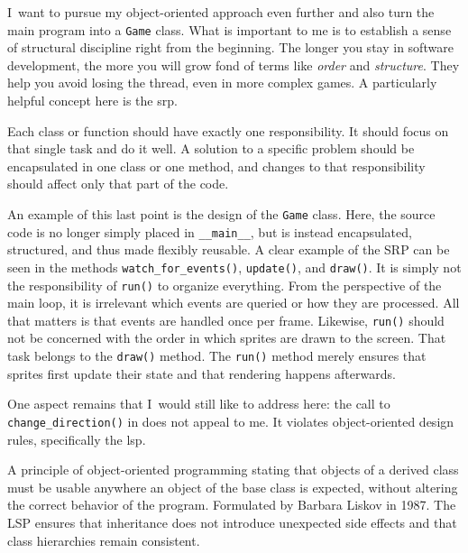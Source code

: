 I~want to pursue my object-oriented approach even further and also turn the main program into a \texttt{Game} class. What is important to me is to establish a sense of structural discipline right from the beginning. The longer you stay in software development, the more you will grow fond of terms like \emph{order} and \emph{structure}. They help you avoid losing the thread, even in more complex games. A particularly helpful concept here is the \Gls{srp}.

\begin{hintbox}
	Each class or function should have exactly one responsibility. It should focus on that single task and do it well. A solution to a specific problem should be encapsulated in one class or one method, and changes to that responsibility should affect only that part of the code.
\end{hintbox}



An example of this last point is the design of the \texttt{Game} class. Here, the source code is no longer simply placed in \texttt{\_\_main\_\_}, but is instead encapsulated, structured, and thus made flexibly reusable. A clear example of the SRP can be seen in the methods \texttt{watch\_for\_events()}, \texttt{update()}, and \texttt{draw()}. It is simply not the responsibility of \texttt{run()} to organize everything. From the perspective of the main loop, it is irrelevant which events are queried or how they are processed. All that matters is that events are handled once per frame. Likewise, \texttt{run()} should not be concerned with the order in which sprites are drawn to the screen. That task belongs to the \texttt{draw()} method. The \texttt{run()} method merely ensures that sprites first update their state and that rendering happens afterwards.

One aspect remains that I~would still like to address here: the call to \texttt{change\_direction()} in  does not appeal to me. It violates object-oriented design rules, specifically the \Gls{lsp}.

\begin{hintbox}
	A principle of object-oriented programming stating that objects of a derived class must be usable anywhere an object of the base class is expected, without altering the correct behavior of the program. Formulated by Barbara Liskov in 1987. The LSP ensures that inheritance does not introduce unexpected side effects and that class hierarchies remain consistent.
\end{hintbox}

